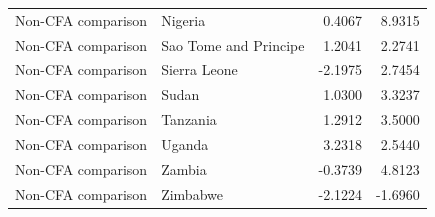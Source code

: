 \begin{table}
\begin{tabular}[t]{llrr}
Non-CFA comparison & Nigeria & 0.4067 & 8.9315\\
Non-CFA comparison & Sao Tome and Principe & 1.2041 & 2.2741\\
Non-CFA comparison & Sierra Leone & -2.1975 & 2.7454\\
\addlinespace
Non-CFA comparison & Sudan & 1.0300 & 3.3237\\
Non-CFA comparison & Tanzania & 1.2912 & 3.5000\\
Non-CFA comparison & Uganda & 3.2318 & 2.5440\\
Non-CFA comparison & Zambia & -0.3739 & 4.8123\\
Non-CFA comparison & Zimbabwe & -2.1224 & -1.6960\\
\bottomrule
\end{tabular}
\end{table}